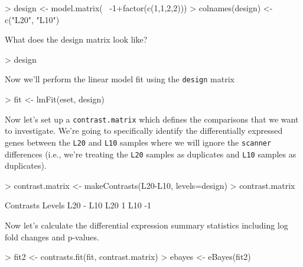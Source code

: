 \documentclass[12pt]{article}
\newcommand{\code}[1]{{\texttt{#1}}}
\begin{document}
\begin{Schunk}
\begin{Sinput}
> design <- model.matrix(~ -1+factor(c(1,1,2,2)))
> colnames(design) <- c("L20", "L10")
\end{Sinput}
\end{Schunk}

What does the design matrix look like?

\begin{Schunk}
\begin{Sinput}
> design
\end{Sinput}
\end{Schunk}

Now we'll perform the linear model fit using the \code{design} matrix

\begin{Schunk}
\begin{Sinput}
> fit <- lmFit(eset, design)
\end{Sinput}
\end{Schunk}

Now let's set up a \code{contrast.matrix} which defines the comparisons that we want to investigate.  We're going to specifically identify the differentially expressed genes between the \code{L20} and \code{L10} samples where we will ignore the \code{scanner} differences (i.e., we're treating the \code{L20} samples as duplicates and \code{L10} samples as duplicates).

\begin{Schunk}
\begin{Sinput}
> contrast.matrix <- makeContrasts(L20-L10, levels=design)
> contrast.matrix
\end{Sinput}
\begin{Soutput}
      Contrasts
Levels L20 - L10
   L20         1
   L10        -1
\end{Soutput}
\end{Schunk}

Now let's calculate the differential expression summary statistics including log fold changes and p-values.

\begin{Schunk}
\begin{Sinput}
> fit2 <- contrasts.fit(fit, contrast.matrix)
> ebayes <- eBayes(fit2)
\end{Sinput}
\end{Schunk}
\end{document}
